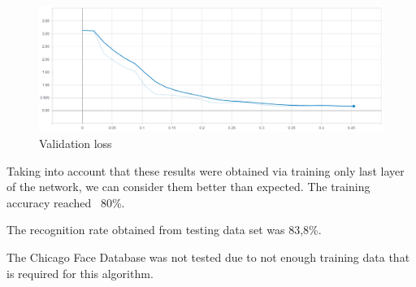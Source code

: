 \begin{figure}[H]
\centering
\includegraphics[scale=0.5]{img/valid_loss.png}
\caption{Validation loss}
\end{figure}

Taking into account that these results were obtained via training only last layer of the network, we can consider them better than expected. The training accuracy reached ~80\%.

The recognition rate obtained from testing data set was 83,8\%.

The Chicago Face Database was not tested due to not enough training data that is required for this algorithm. 
